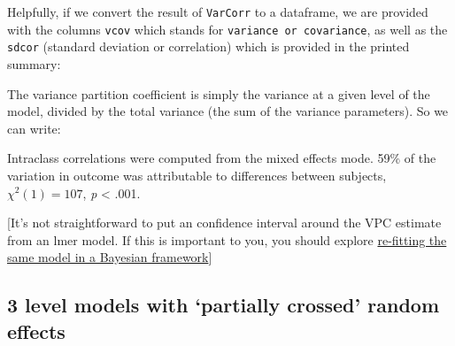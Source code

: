 \documentclass[]{article}
\newenvironment{Shaded}{\begin{snugshade}}{\end{snugshade}}
\newcommand{\KeywordTok}[1]{\textcolor[rgb]{0.13,0.29,0.53}{\textbf{#1}}}
\newcommand{\DataTypeTok}[1]{\textcolor[rgb]{0.13,0.29,0.53}{#1}}
\newcommand{\StringTok}[1]{\textcolor[rgb]{0.31,0.60,0.02}{#1}}
\newcommand{\OperatorTok}[1]{\textcolor[rgb]{0.81,0.36,0.00}{\textbf{#1}}}
\newcommand{\NormalTok}[1]{#1}
\theoremstyle{definition}
\theoremstyle{definition}
\theoremstyle{definition}
\theoremstyle{remark}
\begin{document}
Helpfully, if we convert the result of \texttt{VarCorr} to a dataframe,
we are provided with the columns \texttt{vcov} which stands for
\texttt{variance\ or\ covariance}, as well as the \texttt{sdcor}
(standard deviation or correlation) which is provided in the printed
summary:

\begin{Shaded}
\end{Shaded}

The variance partition coefficient is simply the variance at a given
level of the model, divided by the total variance (the sum of the
variance parameters). So we can write:

\begin{Shaded}
\end{Shaded}

{Intraclass correlations were computed from the mixed effects mode. 59\%
of the variation in outcome was attributable to differences between
subjects, \(\chi^2(1) = 107\), \emph{p} \textless{} .001.}

{[}It's not straightforward to put an confidence interval around the VPC
estimate from an lmer model. If this is important to you, you should
explore \protect\hyperlink{bayes-mcmc}{re-fitting the same model in a
Bayesian framework}{]}

\subsection*{\texorpdfstring{3 level models with `partially crossed'
random
effects}{3 level models with partially crossed random effects}}\label{threelevel}
\end{document}
